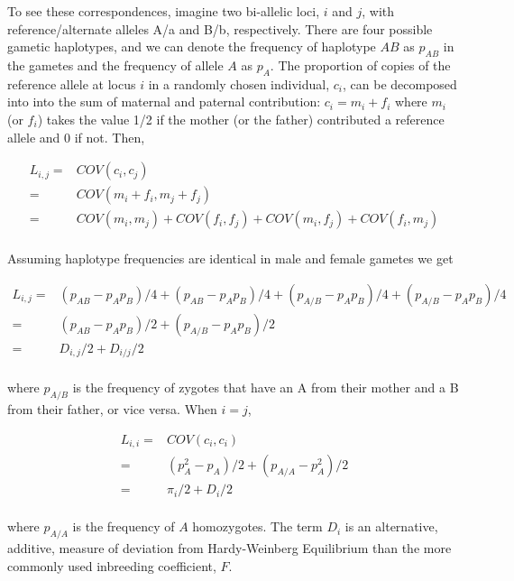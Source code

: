 \documentclass[12pt]{article}
\begin{document}
\begin{bibunit}
To see these correspondences, imagine two bi-allelic loci, $i$ and $j$, with reference/alternate alleles A/a and B/b, respectively. There are four possible gametic haplotypes, and we can denote the frequency of haplotype $AB$ as $p_{AB}$ in the gametes and the frequency of allele $A$ as $p_A$. The proportion of copies of the reference allele at locus $i$ in a randomly chosen individual, $c_i$, can be decomposed into into the sum of maternal and paternal contribution: $c_i = m_i+f_i$ where $m_i$ (or $f_i$) takes the value 1/2 if the mother (or the father) contributed a reference allele and 0 if not. Then,

\begin{equation}
\begin{array}{rl}
L_{i,j} =& COV(c_i, c_j)\\
        =& COV(m_i+f_i,  m_j+f_j)\\
        =& COV(m_i,  m_j)+COV(f_i,f_j)+COV(m_i,  f_j)+COV(f_i,  m_j)\\
\end{array}
\end{equation}

Assuming haplotype frequencies are identical in male and female gametes we get

\begin{equation}
\begin{array}{rl}
L_{i,j} =& (p_{AB}-p_{A}p_{B})/4+(p_{AB}-p_{A}p_{B})/4+(p_{A/B}-p_{A}p_{B})/4+(p_{A/B}-p_{A}p_{B})/4\\
=& (p_{AB}-p_{A}p_{B})/2+(p_{A/B}-p_{A}p_{B})/2\\
=& D_{i,j}/2+D_{i/j}/2\\
\end{array}
\end{equation}

where $p_{A/B}$ is the frequency of zygotes that have an A from their mother and a B from their father, or vice versa.  When $i=j$,

\begin{equation}
\begin{array}{rl}
L_{i,i} =& COV(c_i, c_i)\\
=& (p_{A}^2-p_{A})/2+(p_{A/A}-p_{A}^2)/2\\
=& \pi_i/2+D_{i}/2\\
\end{array}
\end{equation}

where $p_{A/A}$ is the frequency of $A$ homozygotes. The term $D_i$ is an alternative, additive, measure of deviation from Hardy-Weinberg Equilibrium than the more commonly used inbreeding coefficient, $F$. 


\end{bibunit}
\end{document}
